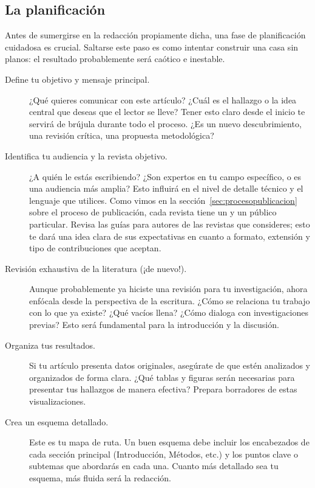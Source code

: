 \subsection*{La planificación}
\label{sub:planificacionarticulo}

Antes de sumergirse en la redacción propiamente dicha, una fase de planificación
cuidadosa es crucial.
Saltarse este paso es como intentar construir una casa sin planos: el resultado
probablemente será caótico e inestable.

\begin{description}
  \item[Define tu objetivo y mensaje principal.] ¿Qué quieres comunicar con
        este artículo? ¿Cuál es el hallazgo o la idea central que deseas que
        el lector se lleve?
        Tener esto claro desde el inicio te servirá de brújula durante todo el
        proceso.
        ¿Es un nuevo descubrimiento, una revisión crítica, una propuesta metodológica?

  \item[Identifica tu audiencia y la revista objetivo.] ¿A quién le estás
        escribiendo? ¿Son expertos en tu campo específico, o es una audiencia
        más amplia?
        Esto influirá en el nivel de detalle técnico y el lenguaje que utilices.
        Como vimos en la sección~\ref{sec:procesopublicacion} sobre el proceso
        de publicación, cada revista tiene un 
        y un público particular.
        Revisa las guías para autores de las revistas que consideres; esto te
        dará una idea clara de sus expectativas en cuanto a formato, extensión y
        tipo de contribuciones que aceptan.

  \item[Revisión exhaustiva de la literatura (¡de nuevo!).] Aunque
        probablemente ya hiciste una revisión para tu investigación, ahora
        enfócala desde la perspectiva de la escritura.
        ¿Cómo se relaciona tu trabajo con lo que ya existe?
        ¿Qué vacíos llena? ¿Cómo dialoga con investigaciones previas?
        Esto será fundamental para la introducción y la discusión.

  \item[Organiza tus resultados.] Si tu artículo presenta datos originales,
        asegúrate de que estén analizados y organizados de forma clara.
        ¿Qué tablas y figuras serán necesarias para presentar tus hallazgos de
        manera efectiva? Prepara borradores de estas visualizaciones.

  \item[Crea un esquema detallado.] Este es tu mapa de ruta.
        Un buen esquema debe incluir los encabezados de cada sección principal
        (Introducción, Métodos, etc.) y los puntos clave o subtemas que
        abordarás en cada una.
        Cuanto más detallado sea tu esquema, más fluida será la redacción.
\end{description}

